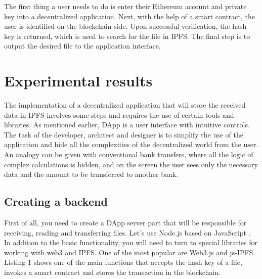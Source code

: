 \documentclass[10pt,conference,a4paper]{IEEEtran_EDM}
\begin{document}
The first thing a user needs to do is enter their Ethereum account and private key into a decentralized application. Next, with the help of a smart contract, the user is identified on the blockchain side. Upon successful verification, the hash key is returned, which is used to search for the file in IPFS. The final step is to output the desired file to the application interface. 



\section{Experimental results}
The implementation of a decentralized application that will store the received data in IPFS involves some steps and requires the use of certain tools and libraries. As mentioned earlier, DApp is a user interface with intuitive controls. The task of the developer, architect and designer is to simplify the use of the application and hide all the complexities of the decentralized world from the user. An analogy can be given with conventional bank transfers, where all the logic of complex calculations is hidden, and on the screen the user sees only the necessary data and the amount to be transferred to another bank.

\subsection{Creating a backend}
First of all, you need to create a DApp server part that will be responsible for receiving, reading and transferring files. Let's use Node.js based on JavaScript \cite{Herron} . In addition to the basic functionality, you will need to turn to special libraries for working with web3 and IPFS. One of the most popular are Web3.js and js-IPFS. Listing 1 shows one of the main functions that accepts the hash key of a file, invokes a smart contract and stores the transaction in the blockchain.

\end{document}
